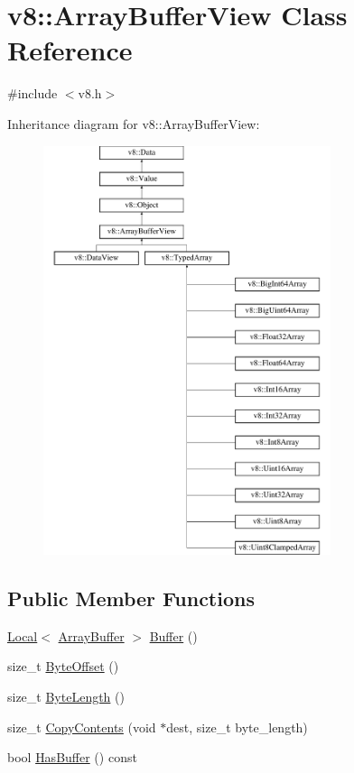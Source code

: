 \hypertarget{classv8_1_1ArrayBufferView}{}\section{v8\+:\+:Array\+Buffer\+View Class Reference}
\label{classv8_1_1ArrayBufferView}


{\ttfamily \#include $<$v8.\+h$>$}

Inheritance diagram for v8\+:\+:Array\+Buffer\+View\+:\begin{figure}[H]
\begin{center}
\leavevmode
\includegraphics[height=12.000000cm]{classv8_1_1ArrayBufferView}
\end{center}
\end{figure}
\subsection*{Public Member Functions}
\begin{DoxyCompactItemize}
\item 
\mbox{\hyperlink{classv8_1_1Local}{Local}}$<$ \mbox{\hyperlink{classv8_1_1ArrayBuffer}{Array\+Buffer}} $>$ \mbox{\hyperlink{classv8_1_1ArrayBufferView_a2ceba3908fbf98ecc81702083127b046}{Buffer}} ()
\item 
size\+\_\+t \mbox{\hyperlink{classv8_1_1ArrayBufferView_a4739a31269f5ebc5b88a708b9429c688}{Byte\+Offset}} ()
\item 
size\+\_\+t \mbox{\hyperlink{classv8_1_1ArrayBufferView_a9fc7563c97e0b639a6c0a3274995bb3c}{Byte\+Length}} ()
\item 
size\+\_\+t \mbox{\hyperlink{classv8_1_1ArrayBufferView_aa728e762ed43194f3a5e05e792fff64e}{Copy\+Contents}} (void $\ast$dest, size\+\_\+t byte\+\_\+length)
\item 
bool \mbox{\hyperlink{classv8_1_1ArrayBufferView_ab1f5835c3dea53a625814a8c3ab2e0ae}{Has\+Buffer}} () const
\end{DoxyCompactItemize}
